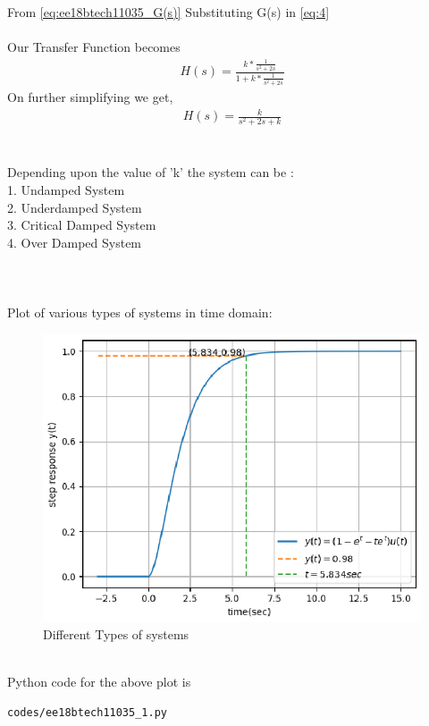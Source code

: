 \begin{enumerate}[label=\thesection.\arabic*.,ref=\thesection.\theenumi]
From \eqref{eq:ee18btech11035_G(s)} Substituting G(s) in \eqref{eq:4} \\
\\Our Transfer Function becomes 
\begin{align}
H(s) = \frac{k*\frac{1}{s^2+2s}}{1+k*\frac{1}{s^2+2s}}
\end{align}
On further simplifying we get,\\
\begin{align}
H(s) = \frac{k}{s^2+2s+k}
\label{eq:H(s)}
\end{align}\\
\\
Depending upon the value of 'k' the system can be : \\
1. Undamped System \\
2. Underdamped System \\
3. Critical Damped System \\
4. Over Damped System 
\\
\\
\\
\\Plot of various types of systems in time domain:

\begin{figure}[!h]
\includegraphics[width=\columnwidth]{./figures/ee18btech11035_1.eps}
\caption{Different Types of systems}
\label{fig:ee18btech11035_different_systems}
\end{figure}\\
Python code for the above plot is
\begin{lstlisting}
codes/ee18btech11035_1.py
\end{lstlisting}


\end{enumerate}
